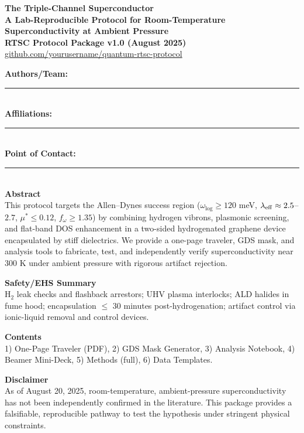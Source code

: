\documentclass[12pt]{article}
\begin{document}
\begin{center}
{\LARGE \textbf{The Triple-Channel Superconductor}}\\[6pt]
{\large \textbf{A Lab-Reproducible Protocol for Room-Temperature Superconductivity at Ambient Pressure}}\\[10pt]
\textbf{RTSC Protocol Package v1.0 (August 2025)}\\[6pt]
\href{https://github.com/yourusername/quantum-rtsc-protocol}{github.com/yourusername/quantum-rtsc-protocol}
\end{center}

\vspace{8mm}
\noindent\textbf{Authors/Team:} \rule{0.8\linewidth}{0.4pt}\\[4mm]
\textbf{Affiliations:} \rule{0.8\linewidth}{0.4pt}\\[4mm]
\textbf{Point of Contact:} \rule{0.8\linewidth}{0.4pt}\\[4mm]

\vspace{6mm}
\noindent\textbf{Abstract}\\
This protocol targets the Allen--Dynes success region ($\omega_{\log}\ge120$ meV, $\lambda_{\rm eff}\approx2.5$--$2.7$, $\mu^*\le0.12$, $f_\omega\ge1.35$) by combining hydrogen vibrons, plasmonic screening, and flat-band DOS enhancement in a two-sided hydrogenated graphene device encapsulated by stiff dielectrics. We provide a one-page traveler, GDS mask, and analysis tools to fabricate, test, and independently verify superconductivity near 300 K under ambient pressure with rigorous artifact rejection.

\vspace{6mm}
\noindent\textbf{Safety/EHS Summary}\\
H$_2$ leak checks and flashback arrestors; UHV plasma interlocks; ALD halides in fume hood; encapsulation $\le$ 30 minutes post-hydrogenation; artifact control via ionic-liquid removal and control devices.

\vspace{6mm}
\noindent\textbf{Contents}\\
1) One-Page Traveler (PDF), 2) GDS Mask Generator, 3) Analysis Notebook, 4) Beamer Mini-Deck, 5) Methods (full), 6) Data Templates.

\vfill
\noindent\textbf{Disclaimer}\\
As of August 20, 2025, room-temperature, ambient-pressure superconductivity has not been independently confirmed in the literature. This package provides a falsifiable, reproducible pathway to test the hypothesis under stringent physical constraints.
\end{document}

